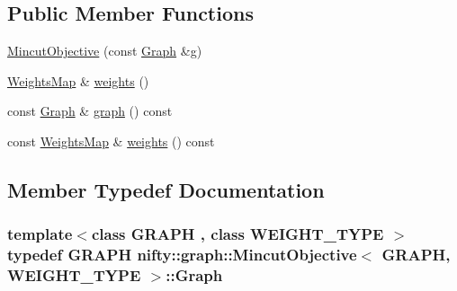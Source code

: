\subsection*{Public Member Functions}
\begin{DoxyCompactItemize}
\item 
\hyperlink{classnifty_1_1graph_1_1MincutObjective_ad2936850d3100734743137b335246329}{Mincut\+Objective} (const \hyperlink{classnifty_1_1graph_1_1MincutObjective_aaf6832d24ebaf942e63081c7d01ab05d}{Graph} \&g)
\item 
\hyperlink{classnifty_1_1graph_1_1MincutObjective_a68accda695f950a00c01c83d3028ccdb}{Weights\+Map} \& \hyperlink{classnifty_1_1graph_1_1MincutObjective_a9f684398b849b71ae4a6a04aa6020b46}{weights} ()
\item 
const \hyperlink{classnifty_1_1graph_1_1MincutObjective_aaf6832d24ebaf942e63081c7d01ab05d}{Graph} \& \hyperlink{classnifty_1_1graph_1_1MincutObjective_ab2db10c51f8b5f7803f6ad4f1e3afbf3}{graph} () const 
\item 
const \hyperlink{classnifty_1_1graph_1_1MincutObjective_a68accda695f950a00c01c83d3028ccdb}{Weights\+Map} \& \hyperlink{classnifty_1_1graph_1_1MincutObjective_acb5bfab8130432b94a7cf20e1ec6445d}{weights} () const 
\end{DoxyCompactItemize}


\subsection{Member Typedef Documentation}
\hypertarget{classnifty_1_1graph_1_1MincutObjective_aaf6832d24ebaf942e63081c7d01ab05d}{}
\subsubsection[{Graph}]{\setlength{\rightskip}{0pt plus 5cm}template$<$class G\+R\+A\+P\+H , class W\+E\+I\+G\+H\+T\+\_\+\+T\+Y\+P\+E $>$ typedef G\+R\+A\+P\+H {\bf nifty\+::graph\+::\+Mincut\+Objective}$<$ G\+R\+A\+P\+H, W\+E\+I\+G\+H\+T\+\_\+\+T\+Y\+P\+E $>$\+::{\bf Graph}}\label{classnifty_1_1graph_1_1MincutObjective_aaf6832d24ebaf942e63081c7d01ab05d}
\hypertarget{classnifty_1_1graph_1_1MincutObjective_ae2da9f8bbdb2d5e7c283b70c78f463c4}{}
